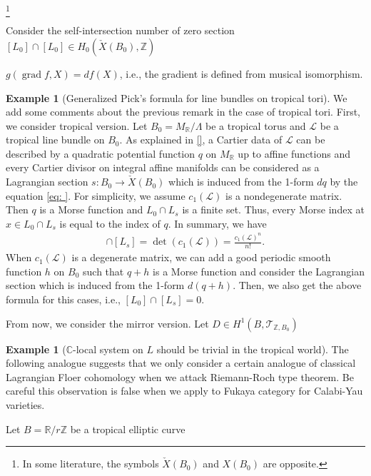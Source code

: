 \documentclass[a4paper,dvipdfmx,reqno,12pt]{amsart}
\theoremstyle{definition}
\newtheorem{Eg}[Thm]{Example}
\newcommand{\C}{\mathbb{C}}%
\newcommand{\R}{\mathbb{R}}%
\newcommand{\Z}{\mathbb{Z}}%
\newcommand{\mcal}[1]{\mathcal{#1}}%
\newcommand{\opn}[1]{\operatorname{#1}}
\newcommand{\TBZ}{\mcal{T}_{\Z,B_0}}
\numberwithin{equation}{section}
\begin{document}
\footnote{In some literature, the symbols $\check{X}(B_0)$ and $X(B_0)$ are opposite.}

Consider the self-intersection number of zero section $[L_0]\cap [L_0] \in H_{0}(\check{X}(B_0),\Z)$

$g(\opn{grad}f,X)=df(X)$, i.e., the gradient is defined from musical isomorphism.

\begin{Eg}[Generalized Pick's formula for line bundles on tropical tori] \label{eg: lattice tori}
  We add some comments about the previous remark in the case of tropical tori.
  First, we consider tropical version.
  Let $B_0=M_{\R}/\Lambda$ be a tropical torus and $\mcal{L}$ be a tropical line bundle on $B_0$. As explained in \ref{}, a Cartier data of $\mcal{L}$ can be described by a quadratic potential function $q$ on $M_{\R}$ up to affine functions and every Cartier divisor on integral affine manifolds can be considered as a Lagrangian section $s: B_0 \to \check{X}(B_0)$ which is induced from the 1-form $dq$ by the equation \ref{eq: }. For simplicity, we assume $c_1(\mcal{L})$ is a nondegenerate matrix. Then $q$ is a Morse function and $L_0 \cap L_s$ is a finite set. Thus, every Morse index at $x\in  L_0\cap L_s$ is equal to the index of $q$. In summary, we have
  \begin{align}
    [L_0]\cap [L_s]=\det (c_1(\mcal{L}))=\frac{c_1(\mcal{L})^{n}}{n!}.
  \end{align}
  When $c_1(\mcal{L})$ is a degenerate matrix, we can add a good periodic smooth function $h$ on $B_0$ such that $q+h$ is a Morse function and consider the Lagrangian section which is induced from the 1-form $d(q+h)$. Then, we also get the above formula for this cases, i.e., $[L_0]\cap [L_s]=0$.

  From now, we consider the mirror version. Let $D\in H^{1}(B,\TBZ)$

\end{Eg}

\begin{Eg}[{$\C$-local system on $L$ should be trivial in the tropical world}]
  The following analogue suggests that we only consider a certain analogue of classical Lagrangian Floer cohomology when we attack Riemann-Roch type theorem. Be careful this observation is false when we apply to Fukaya category for Calabi-Yau varieties.

  Let $B=\R/r\Z$ be a tropical elliptic curve

\end{Eg}
\end{document}
